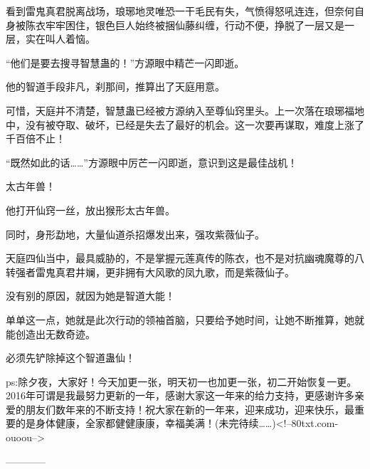 \begin{this_body}
看到雷鬼真君脱离战场，琅琊地灵唯恐一干毛民有失，气愤得怒吼连连，但奈何自身被陈衣牢牢困住，银色巨人始终被捆仙藤纠缠，行动不便，挣脱了一层又是一层，实在叫人着恼。

“他们是要去搜寻智慧蛊的！”方源眼中精芒一闪即逝。

他的智道手段非凡，刹那间，推算出了天庭用意。

可惜，天庭并不清楚，智慧蛊已经被方源纳入至尊仙窍里头。上一次落在琅琊福地中，没有被夺取、破坏，已经是失去了最好的机会。这一次要再谋取，难度上涨了千百倍不止！

“既然如此的话……”方源眼中厉芒一闪即逝，意识到这是最佳战机！

太古年兽！

他打开仙窍一丝，放出猴形太古年兽。

同时，身形勐地，大量仙道杀招爆发出来，强攻紫薇仙子。

天庭四仙当中，最具威胁的，不是掌握元莲真传的陈衣，也不是对抗幽魂魔尊的八转强者雷鬼真君井斓，更非拥有大风歌的凤九歌，而是紫薇仙子。

没有别的原因，就因为她是智道大能！

单单这一点，她就是此次行动的领袖首脑，只要给予她时间，让她不断推算，她就能创造出无数奇迹。

必须先铲除掉这个智道蛊仙！

ps:除夕夜，大家好！今天加更一张，明天初一也加更一张，初二开始恢复一更。2016年可谓是我最努力更新的一年，感谢大家这一年来的给力支持，更感谢许多亲爱的朋友们数年来的不断支持！祝大家在新的一年来，迎来成功，迎来快乐，最重要的是身体健康，全家都健健康康，幸福美满！(未完待续……)<!--80txt.com-ouoou-->

------------

\end{this_body}

